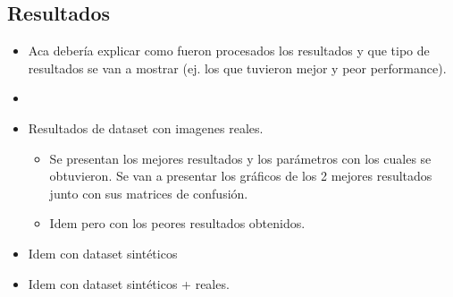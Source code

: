 \subsection{Resultados}
	\begin{itemize}
		\item Aca debería explicar como fueron procesados los
                  resultados y que tipo de resultados se van a mostrar (ej. los
                  que tuvieron mejor y peor performance). 
                \item {}
		\item Resultados de dataset con imagenes reales.
		\begin{itemize}
			\item Se presentan los mejores resultados y los parámetros con los cuales se obtuvieron. Se van a presentar los gráficos de los 2 mejores resultados junto con sus matrices de confusión.
			\item Idem pero con los peores resultados obtenidos.
		\end{itemize}
		\item Idem con dataset sintéticos
		\item Idem con dataset sintéticos + reales.

	\end{itemize}